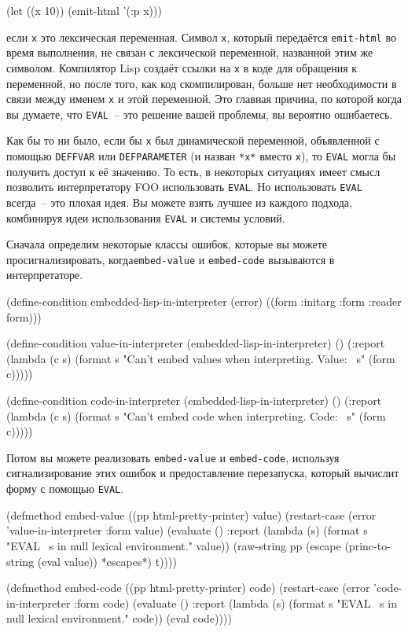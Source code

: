 \begin{myverb}
(let ((x 10)) (emit-html '(:p x)))
\end{myverb}

если \lstinline{х} это лексическая переменная. Символ \lstinline{х}, который передаётся
\lstinline{emit-html} во время выполнения, не связан с лексической переменной, названной этим
же символом. Компилятор Lisp создаёт ссылки на \lstinline{х} в коде для обращения к переменной,
но после того, как код скомпилирован, больше нет необходимости в связи между именем
\lstinline{х} и этой переменной. Это главная причина, по которой когда вы думаете, что
\lstinline{EVAL}~-- это решение вашей проблемы, вы вероятно ошибаетесь.

Как бы то ни было, если бы \lstinline{х} был динамической переменной, объявленной с помощью
\lstinline{DEFFVAR} или \lstinline{DEFPARAMETER} (и назван \lstinline{*х*} вместо \lstinline{х}), то
\lstinline{EVAL} могла бы получить доступ к её значению.  То есть, в некоторых ситуациях имеет
смысл позволить интерпретатору FOO использовать \lstinline{EVAL}. Но использовать \lstinline{EVAL}
всегда~-- это плохая идея. Вы можете взять лучшее из каждого подхода, комбинируя идеи
использования \lstinline{EVAL} и системы условий.

Сначала определим некоторые классы ошибок, которые вы можете просигнализировать,
когда\lstinline{embed-value} и \lstinline{embed-code} вызываются в интерпретаторе.

\begin{myverb}
(define-condition embedded-lisp-in-interpreter (error)
  ((form :initarg :form :reader form)))

(define-condition value-in-interpreter (embedded-lisp-in-interpreter) ()
  (:report
   (lambda (c s) 
     (format s "Can't embed values when interpreting. Value: ~s" (form c)))))

(define-condition code-in-interpreter (embedded-lisp-in-interpreter) ()
  (:report
   (lambda (c s) 
     (format s "Can't embed code when interpreting. Code: ~s" (form c)))))
\end{myverb}

Потом вы можете реализовать \lstinline{embed-value} и \lstinline{embed-code}, используя
сигнализирование этих ошибок и предоставление перезапуска, который вычислит форму с
помощью \lstinline{EVAL}.

\begin{myverb}
(defmethod embed-value ((pp html-pretty-printer) value)
  (restart-case (error 'value-in-interpreter :form value)
    (evaluate ()
      :report (lambda (s) (format s "EVAL ~s in null lexical environment." value))
      (raw-string pp (escape (princ-to-string (eval value)) *escapes*) t))))

(defmethod embed-code ((pp html-pretty-printer) code)
  (restart-case (error 'code-in-interpreter :form code)
    (evaluate ()
      :report (lambda (s) (format s "EVAL ~s in null lexical environment." code))
      (eval code))))
\end{myverb}

